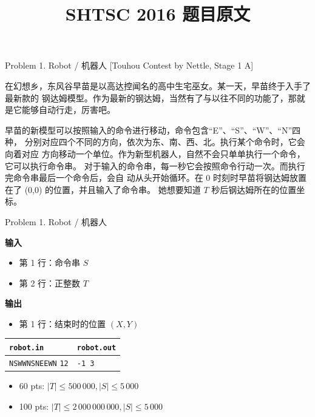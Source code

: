 \documentclass[UTF8]{beamer}
\begin{document}
\title{SHTSC 2016 题目原文}
\frame{\titlepage}


\begin{frame}{Problem 1. Robot / 机器人}
[Touhou Contest by Nettle, Stage 1 A]

在幻想乡，东风谷早苗是以高达控闻名的高中生宅巫女。某一天，早苗终于入手了最新款的
钢达姆模型。作为最新的钢达姆，当然有了与以往不同的功能了，那就是它能够自动行走，厉害吧。

早苗的新模型可以按照输入的命令进行移动，命令包含“E”、“S”、“W”、“N”四种，
分别对应四个不同的方向，依次为东、南、西、北。执行某个命令时，它会向着对应
方向移动一个单位。作为新型机器人，自然不会只单单执行一个命令，它可以执行命令串。
对于输入的命令串，每一秒它会按照命令行动一次。而执行完命令串最后一个命令后，会自
动从头开始循环。在 0 时刻时早苗将钢达姆放置在了 (0,0) 的位置，并且输入了命令串。
她想要知道 $T$ 秒后钢达姆所在的位置坐标。

\end{frame}

\begin{frame}{Problem 1. Robot / 机器人}

\textbf{输入}
\begin{itemize}
    \item 第 1 行：命令串 $S$
    \item 第 2 行：正整数 $T$
\end{itemize}
\textbf{输出}
\begin{itemize}
    \item 第 1 行：结束时的位置 $(X, Y)$
\end{itemize}

\begin{tabularx}{\textwidth}{|X|X|}
\hline
\texttt{\textbf{robot.in}} & \texttt{\textbf{robot.out}} \\ \hline
\texttt{NSWWNSNEEWN}\newline
\texttt{12}
&
\texttt{-1 3}
\\ \hline
\end{tabularx}
\newline
\begin{itemize}
    \item 60 pts: $|T| \leq 500\,000, |S| \leq 5\,000$
    \item 100 pts: $|T| \leq 2\,000\,000\,000, |S| \leq 5\,000$
\end{itemize}

\end{frame}
\end{document}

